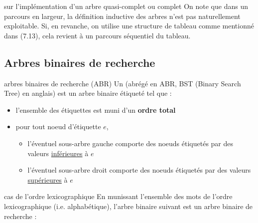 \begin{remarque}{7.23}{sur l'implémentation d'un arbre quasi-complet ou complet}
    On note que dans un parcours en largeur, la définition inductive des arbres n'est pas naturellement exploitable. Si, en revanche, on utilise une structure de tableau comme mentionné dans (7.13), cela revient à un parcours séquentiel du tableau.
\end{remarque}

\subsection{Arbres binaires de recherche}

\begin{definition}{7.24}{arbres binaires de recherche (ABR)}
    Un  (abrégé en ABR, BST (Binary Search Tree) en anglais) est un arbre binaire étiqueté tel que : \begin{itemize}
        \item l'ensemble des étiquettes est muni d'un \textbf{ordre total}
        \item pour tout noeud d'étiquette $e$, \begin{itemize}
            \item l'éventuel sous-arbre gauche comporte des noeuds étiquetés par des valeurs \underline{inférieures} à $e$
            \item l'éventuel sous-arbre droit comporte des noeuds étiquetés par des valeurs \underline{supérieures} à $e$
        \end{itemize}
    \end{itemize}
\end{definition}

\begin{exemple}{7.25}{cas de l'ordre lexicographique}
    En munissant l'ensemble des mots de l'ordre lexicographique (i.e. alphabétique), l'arbre binaire suivant est un arbre binaire de recherche :
    \begin{center}
\end{center}
\end{exemple}


